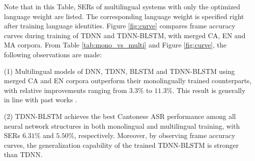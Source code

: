 \documentclass[a4paper]{article}
\begin{document}
Note that in this Table, SERs of multilingual systems with only the optimized language weight are listed. The corresponding language weight is specified right after training language identities. Figure \ref{fig:curve} compares frame accuracy curves during training of TDNN and TDNN-BLSTM, with merged CA, EN and MA corpora.
From Table \ref{tab:mono_vs_multi} and Figure \ref{fig:curve}, the following observations are made:

(1) Multilingual models of DNN, TDNN, BLSTM and TDNN-BLSTM using merged CA and EN corpora outperform their monolingually trained counterparts, with relative improvements ranging from $3.3\%$ to $11.3\%$. This result is generally in line with past works \cite{Huang2013cross,Zhou2017}.

(2) TDNN-BLSTM achieves the best Cantonese ASR performance among all neural network structures in both monolingual and multilingual training, with SERs $6.31\%$ and $5.50\%$, respectively. Moreover,
by observing frame accuracy curves, the generalization capability of the trained TDNN-BLSTM is stronger than TDNN.
\end{document}
